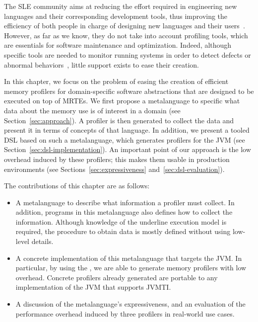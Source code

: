 
The \gls{SLE} community aims at reducing the effort required in engineering new languages and their corresponding development tools, thus improving the efficiency of both people in charge of designing new languages and their users~\cite{sle}. 
However, as far as we know, they do not take into account profiling tools, which are essentials for software maintenance and optimization.
Indeed, although specific tools are needed to monitor running systems in order to detect defects or abnormal behaviors~\cite{duesterwald2000software, Jovic:2011:CMY:2076021.2048081},
little support exists to ease their creation.

In this chapter, we focus on the problem of easing the creation of efficient memory profilers for domain-specific software abstractions that are designed to be executed on top of MRTEs. 
We first propose a metalanguage to specific what data about the memory use is of interest in a domain (see Section~\ref{sec:approach}).
A profiler is then generated to collect the data and present it in terms of concepts of that language. 
In addition, we present a tooled DSL based on such a metalanguage, which generates profilers for the JVM (see Section~\ref{sec:dsl-implementation}).
An important point of our approach is the low overhead induced by these profilers; this makes them usable in production environments (see Sections~\ref{sec:expressiveness} and~\ref{sec:dsl-evaluation}).

The contributions of this chapter are as follows:
\begin{itemize}
\item A metalanguage to describe what information a profiler must collect.
In addition, programs in this metalanguage also defines how to collect the information.
Although knowledge of the underline execution model is required, the procedure to obtain data is mostly defined without using low-level details.  

\item A concrete implementation of this metalanguage that targets the JVM.
In particular, by using the , we are able to generate memory profilers with low overhead.
Concrete profilers already generated are portable to any implementation of the JVM that supports JVMTI.

\item A discussion of the metalanguage's expressiveness, and an evaluation of the performance overhead induced by three profilers in real-world use cases.
\end{itemize}
